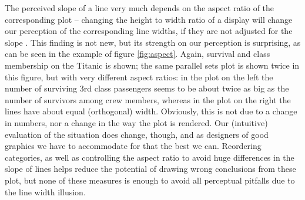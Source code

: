 The perceived slope of a line very much depends on the aspect ratio of the corresponding plot -- changing the height to width ratio of a display  will change our perception of the corresponding line widths, if they are not adjusted for the slope \cite{cleveland:1984}. This finding is not new, but its strength on our perception is surprising, as can be seen in the example of  figure \ref{fig:aspect}.  Again, survival and class membership on the Titanic is shown; the same parallel sets plot is shown twice in this figure, but with very different aspect ratios: in the  plot on the left the number of surviving 3rd class passengers seems to be about twice as big as the number of survivors among crew members, whereas in the plot on the right the lines have about equal (orthogonal) width. Obviously, this is not due to a change in numbers, nor a change in the way the plot is rendered. Our (intuitive) evaluation of the situation does change, though, and as designers of good graphics we have to accommodate for that the best we can. Reordering categories, as well as controlling the aspect ratio to avoid huge differences in the slope of lines helps reduce the potential of drawing wrong conclusions from these plot, but none of these measures is enough to avoid all perceptual pitfalls due to the line width illusion.








%




